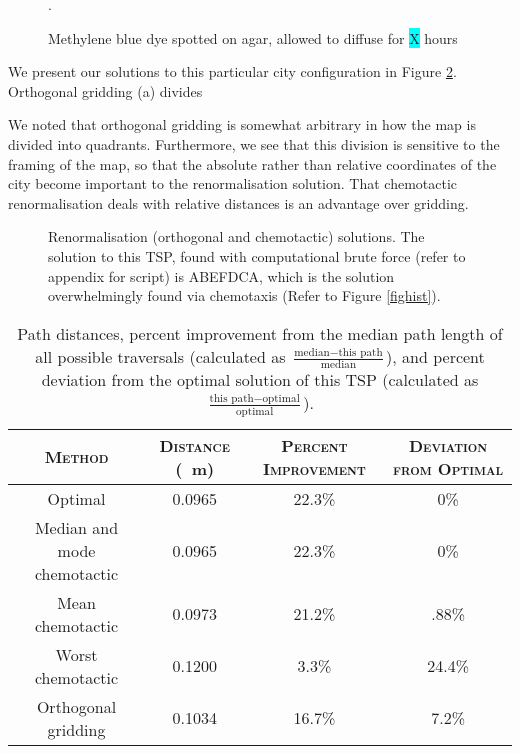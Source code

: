 \documentclass[10pt]{article}
\newcommand{\note}[1]{\colorbox{cyan}{#1}}
\begin{document}
\begin{figure}[H]
	\centering
	\caption{Methylene blue dye spotted on agar, allowed to diffuse for \note{X} hours}.
	\label{figdye}
\end{figure}

We present our solutions to this particular city configuration in Figure \ref{figsol}. Orthogonal gridding (a) divides

We noted that orthogonal gridding is somewhat arbitrary in how the map is divided into quadrants. Furthermore, we see that this division is sensitive to the framing of the map, so that the absolute rather than relative coordinates of the city become important to the renormalisation solution. That chemotactic renormalisation deals with relative distances is an advantage over gridding.


\begin{figure}[H]
	\centering
    \caption{Renormalisation (orthogonal and chemotactic) solutions. The solution to this TSP, found with computational brute force (refer to appendix for script) is ABEFDCA, which is the solution overwhelmingly found via chemotaxis (Refer to Figure \ref{fighist}).}
    \label{figsol}
\end{figure}


\begin{table}[H]
	\centering
	\begin{tabular}{c | c c c}
	\hline
	\textsc{Method} & \textsc{Distance} (\SI{}{\meter}) & \textsc{Percent Improvement} & \textsc{Deviation from Optimal} \\
	\hline
	Optimal 					& 0.0965 & 22.3\% & 0\% 	\\
    Median and mode chemotactic & 0.0965 & 22.3\% & 0\% 	\\
	Mean chemotactic 			& 0.0973 & 21.2\% & .88\% 	\\
    Worst chemotactic 			& 0.1200 & 3.3\%  & 24.4\% 	\\
	Orthogonal gridding 		& 0.1034 & 16.7\% & 7.2\% 	\\
	\hline
	\end{tabular}
	\caption{Path distances, percent improvement from the median path length of all possible traversals (calculated as $ \frac{\text{median} - \text{this path}}{\text{median}} $), and percent deviation from the optimal solution of this TSP (calculated as $ \frac{\text{this path} - \text{optimal}}{\text{optimal}} $).}
\end{table}
\end{document}
